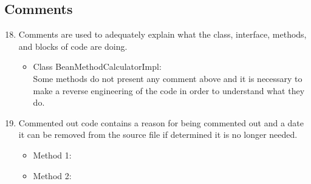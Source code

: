 \subsection{Comments}
\begin{enumerate}
\setcounter{enumi}{17}
	\item  Comments are used to adequately explain what the class, interface, methods, and blocks
	of code are doing.
		\begin{itemize}
		 	\item Class BeanMethodCalculatorImpl: \xmark\\
		 	Some methods do not present any comment above and it is necessary to make a reverse engineering of the code in order to understand what they do.
		\end{itemize}
	\item Commented out code contains a reason for being commented out and a date it can be removed from the source file if determined it is no longer needed.
		\begin{itemize}
		 	\item Method 1: \cmark
	 		\item Method 2: \cmark
		\end{itemize}
\end{enumerate}